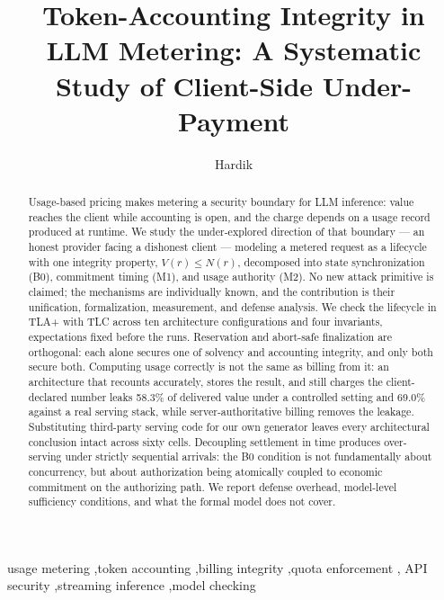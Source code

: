 \documentclass[preprint,3p,authoryear,12pt]{elsarticle}
\begin{document}
\begin{frontmatter}

\title{Token-Accounting Integrity in LLM Metering: A Systematic Study of Client-Side
Under-Payment}

\author[iitp,vips]{Hardik}
\address[iitp]{Department of Computer Science and Data Analytics, Indian Institute of
Technology Patna, India}
\address[vips]{Vivekananda School of Engineering and Technology, Vivekananda Institute
of Professional Studies --- Technical Campus, New Delhi, India}

\begin{abstract}
Usage-based pricing makes metering a security boundary for LLM inference: value reaches
the client while accounting is open, and the charge depends on a usage record produced
at runtime. We study the under-explored direction of that boundary --- an honest
provider facing a dishonest client --- modeling a metered request as a lifecycle with
one integrity property, $V(r) \le N(r)$, decomposed into state synchronization (B0),
commitment timing (M1), and usage authority (M2). No new attack primitive is claimed; the
mechanisms are individually known, and the contribution is their unification,
formalization, measurement, and defense analysis. We check the lifecycle in TLA+ with TLC
across ten architecture configurations and four invariants, expectations fixed before the
runs. Reservation and abort-safe finalization are orthogonal: each alone secures one of
solvency and accounting integrity, and only both secure both. Computing usage correctly
is not the same as billing from it: an architecture that recounts accurately, stores the
result, and still charges the client-declared number leaks 58.3\% of delivered value
under a controlled setting and 69.0\% against a real serving stack, while
server-authoritative billing removes the leakage. Substituting third-party serving code
for our own generator leaves every architectural conclusion intact across sixty cells.
Decoupling settlement in time produces over-serving under strictly sequential arrivals:
the B0 condition is not fundamentally about concurrency, but about authorization being
atomically coupled to economic commitment on the authorizing path. We report defense
overhead, model-level sufficiency conditions, and what the formal model does not cover.
\end{abstract}

\begin{keyword}
usage metering \sep token accounting \sep billing integrity \sep quota enforcement \sep
API security \sep streaming inference \sep model checking
\end{keyword}

\end{frontmatter}
\end{document}
